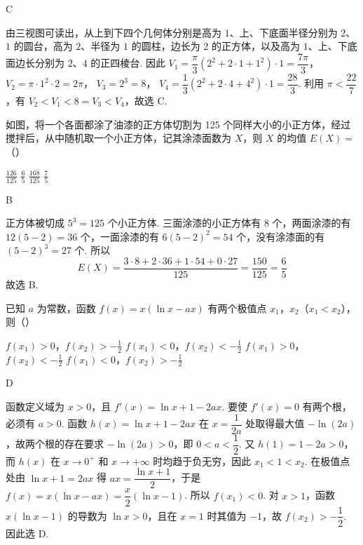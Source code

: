 \begin{answer}
C
\end{answer}

\begin{solution}
由三视图可读出，从上到下四个几何体分别是高为 \(1\)、上、下底面半径分别为 \(2\)、\(1\) 的圆台，高为 \(2\)、半径为 \(1\) 的圆柱，边长为 \(2\) 的正方体，以及高为 \(1\)、上、下底面边长分别为 \(2\)、\(4\) 的正四棱台.
因此
\(V_1=\dfrac{\pi}{3}(2^2+2\cdot1+1^2)\cdot1=\dfrac{7\pi}{3}\)，
\(V_2=\pi\cdot1^2\cdot2=2\pi\)，
\(V_3=2^3=8\)，
\(V_4=\dfrac{1}{3}(2^2+2\cdot4+4^2)\cdot1=\dfrac{28}{3}\).
利用 \(\pi<\dfrac{22}{7}\)，有 \(V_2<V_1<8=V_3<V_4\)，故选 C.
\end{solution}

\begin{problem}
如图，将一个各面都涂了油漆的正方体切割为 125 个同样大小的小正方体，经过搅拌后，从中随机取一个小正方体，记其涂漆面数为 \(X\)，则 \(X\) 的均值 \(E(X) =\)（\quad）


\choices
    {\(\frac{126}{125}\)}
    {\(\frac{6}{5}\)}
    {\(\frac{168}{125}\)}
    {\(\frac{7}{5}\)}
\end{problem}

\begin{answer}
B
\end{answer}

\begin{solution}
正方体被切成 \(5^3=125\) 个小正方体. 三面涂漆的小正方体有 \(8\) 个，两面涂漆的有 \(12(5-2)=36\) 个，一面涂漆的有 \(6(5-2)^2=54\) 个，没有涂漆面的有 \((5-2)^3=27\) 个.
所以
\[
E(X)=\frac{3\cdot8+2\cdot36+1\cdot54+0\cdot27}{125}=\frac{150}{125}=\frac65
\]
故选 B.
\end{solution}

\begin{problem}
已知 \(a\) 为常数，函数 \(f(x) = x(\ln x - ax)\) 有两个极值点 \(x_1\)，\(x_2\)（\(x_1 < x_2\)），则（\quad）

\choices
    {\(f(x_1) > 0\)，\(f(x_2) > -\frac{1}{2}\)}
    {\(f(x_1) < 0\)，\(f(x_2) < -\frac{1}{2}\)}
    {\(f(x_1) > 0\)，\(f(x_2) < -\frac{1}{2}\)}
    {\(f(x_1) < 0\)，\(f(x_2) > -\frac{1}{2}\)}
\end{problem}

\begin{answer}
D
\end{answer}

\begin{solution}
函数定义域为 \(x>0\)，且
\(f'(x)=\ln x+1-2ax\).
要使 \(f'(x)=0\) 有两个根，必须有 \(a>0\). 函数 \(h(x)=\ln x+1-2ax\) 在 \(x=\dfrac{1}{2a}\) 处取得最大值 \(-\ln(2a)\)，故两个根的存在要求 \(-\ln(2a)>0\)，即 \(0<a<\dfrac12\).
又 \(h(1)=1-2a>0\)，而 \(h(x)\) 在 \(x\to0^+\) 和 \(x\to+\infty\) 时均趋于负无穷，因此 \(x_1<1<x_2\).
在极值点处由 \(\ln x+1=2ax\) 得 \(ax=\dfrac{\ln x+1}{2}\)，于是
\(f(x)=x(\ln x-ax)=\dfrac{x}{2}(\ln x-1)\).
所以 \(f(x_1)<0\). 对 \(x>1\)，函数 \(x(\ln x-1)\) 的导数为 \(\ln x>0\)，且在 \(x=1\) 时其值为 \(-1\)，故 \(f(x_2)>-\dfrac12\).
因此选 D.
\end{solution}

